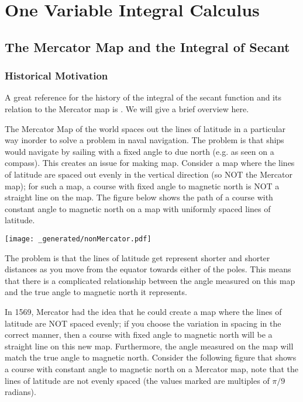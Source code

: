 \section{One Variable Integral Calculus}

\subsection{The Mercator Map and the Integral of Secant}

\subsubsection*{Historical Motivation}

A great reference for the history of the integral of the secant function and its relation to the Mercator map is \cite{mercator}. We will give a brief overview here.

The Mercator Map of the world spaces out the lines of latitude in a particular way inorder to solve a problem in naval navigation. 
The problem is that ships would navigate by sailing with a fixed angle to due north (e.g. as seen on a compass). 
This creates an issue for making map. 
Consider a map where the lines of latitude are spaced out evenly in the vertical direction (so NOT the Mercator map); for such a map, a course with fixed angle to magnetic north is NOT a straight line on the map.  
The figure below shows the path of a course with constant angle to magnetic north on a map with uniformly spaced lines of latitude.

\texttt{[image: \_generated/nonMercator.pdf]}

The problem is that the lines of latitude get represent shorter and shorter distances as you move from the equator towards either of the poles. 
This means that there is a complicated relationship between the angle measured on this map and the true angle to magnetic north it represents.

In 1569, Mercator had the idea that he could create a map where the lines of latitude are NOT spaced evenly; if you choose the variation in spacing in the correct manner, then a course with fixed angle to magnetic north will be a straight line on this new map. 
Furthermore, the angle measured on the map will match the true angle to magnetic north.
Consider the following figure that shows a course with constant angle to magnetic north on a Mercator map, note that the lines of latitude are not evenly spaced (the values marked are multiples of \(\pi/9\) radians).

